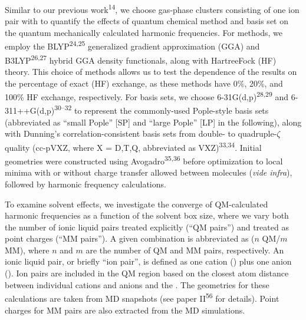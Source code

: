 Similar to our previous work\textsuperscript{14}, we choose gas-phase clusters consisting of one \ce{[C4C1im][PF6]} ion pair with  to quantify the effects of quantum chemical method and basis set on the quantum mechanically calculated harmonic frequencies. For methods, we employ the BLYP\textsuperscript{24,25} generalized gradient approximation (GGA) and B3LYP\textsuperscript{26,27} hybrid GGA density functionals, along with Hartree\textendash{}Fock (HF) theory. This choice of methods allows us to test the dependence of the results on the percentage of exact (HF) exchange, as these methods have 0\%, 20\%, and 100\% HF exchange, respectively. For basis sets, we choose 6-31G(d,p)\textsuperscript{28,29} and 6-311++G(d,p)\textsuperscript{30--32} to represent the commonly-used Pople-style basis sets (abbreviated as ``small Pople'' [SP] and ``large Pople'' [LP] in the following), along with Dunning's correlation-consistent basis sets from double- to quadruple-\(\zeta\) quality (cc-pVXZ, where X = D,T,Q, abbreviated as VXZ)\textsuperscript{33,34}. Initial geometries were constructed using Avogadro\textsuperscript{35,36} before optimization to local minima with or without charge transfer allowed between molecules (\textit{vide infra}), followed by harmonic frequency calculations.

To examine solvent effects, we investigate the converge of QM-calculated harmonic frequencies as a function of the solvent box size, where we vary both the number of ionic liquid pairs treated explicitly (``QM pairs'') and treated as point charges (``MM pairs''). A given combination is abbreviated as (\(n\) QM/\(m\) MM), where \(n\) and \(m\) are the number of QM and MM pairs, respectively. An ionic liquid pair, or briefly ``ion pair'', is defined as one cation (\ce{[C4C1im]+}) plus one anion (\ce{[PF6]-}). Ion pairs are included in the QM region based on the closest atom distance between individual cations and anions and the . The geometries for these calculations are taken from MD snapshots (see paper II\textsuperscript{56} for details). Point charges for MM pairs are also extracted from the MD simulations.

